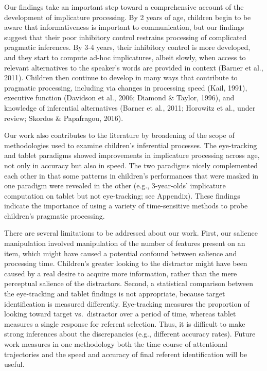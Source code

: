 \documentclass[a4paper,man,apacite,floatsintext]{apa6}
\begin{document}
Our findings take an important step toward a comprehensive account of
the development of implicature processing. By 2 years of age, children
begin to be aware that informativeness is important to communication,
but our findings suggest that their poor inhibitory control restrains
processing of complicated pragmatic inferences. By 3-4 years, their
inhibitory control is more developed, and they start to compute ad-hoc
implicatures, albeit slowly, when access to relevant alternatives to the
speaker's words are provided in context (Barner et al., 2011). Children
then continue to develop in many ways that contribute to pragmatic
processing, including via changes in processing speed (Kail, 1991),
executive function (Davidson et al., 2006; Diamond \& Taylor, 1996), and
knowledge of inferential alternatives (Barner et al., 2011; Horowitz et
al., under review; Skordos \& Papafragou, 2016).

Our work also contributes to the literature by broadening of the scope
of methodologies used to examine children's inferential processes. The
eye-tracking and tablet paradigms showed improvements in implicature
processing across age, not only in accuracy but also in speed. The two
paradigms nicely complemented each other in that some patterns in
children's performances that were masked in one paradigm were revealed
in the other (e.g., 3-year-olds' implicature computation on tablet but
not eye-tracking; see Appendix). These findings indicate the importance
of using a variety of time-sensitive methods to probe children's
pragmatic processing.

There are several limitations to be addressed about our work. First, our
salience manipulation involved manipulation of the number of features
present on an item, which might have caused a potential confound between
salience and processing time. Children's greater looking to the
distractor might have been caused by a real desire to acquire more
information, rather than the mere perceptual salience of the
distractors. Second, a statistical comparison between the eye-tracking
and tablet findings is not appropriate, because target identification is
measured differently. Eye-tracking measures the proportion of looking
toward target vs.~distractor over a period of time, whereas tablet
measures a single response for referent selection. Thus, it is difficult
to make strong inferences about the discrepancies (e.g., different
accuracy rates). Future work measures in one methodology both the time
course of attentional trajectories and the speed and accuracy of final
referent identification will be useful.
\end{document}
